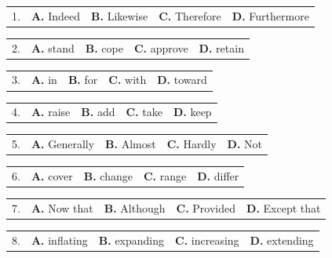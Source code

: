 \documentclass[UTF8,11pt]{ctexart}
\begin{document}
\noindent\begin{tabularx}{\linewidth}{@{}lXXXX@{}}1. & \textbf{A.} Indeed & \textbf{B.} Likewise & \textbf{C.} Therefore & \textbf{D.} Furthermore\\\end{tabularx}\par

\noindent\begin{tabularx}{\linewidth}{@{}lXXXX@{}}2. & \textbf{A.} stand & \textbf{B.} cope & \textbf{C.} approve & \textbf{D.} retain\\\end{tabularx}\par

\noindent\begin{tabularx}{\linewidth}{@{}lXXXX@{}}3. & \textbf{A.} in & \textbf{B.} for & \textbf{C.} with & \textbf{D.} toward\\\end{tabularx}\par

\noindent\begin{tabularx}{\linewidth}{@{}lXXXX@{}}4. & \textbf{A.} raise & \textbf{B.} add & \textbf{C.} take & \textbf{D.} keep\\\end{tabularx}\par

\noindent\begin{tabularx}{\linewidth}{@{}lXXXX@{}}5. & \textbf{A.} Generally & \textbf{B.} Almost & \textbf{C.} Hardly & \textbf{D.} Not\\\end{tabularx}\par

\noindent\begin{tabularx}{\linewidth}{@{}lXXXX@{}}6. & \textbf{A.} cover & \textbf{B.} change & \textbf{C.} range & \textbf{D.} differ\\\end{tabularx}\par

\noindent\begin{tabularx}{\linewidth}{@{}lXXXX@{}}7. & \textbf{A.} Now that & \textbf{B.} Although & \textbf{C.} Provided & \textbf{D.} Except that\\\end{tabularx}\par

\noindent\begin{tabularx}{\linewidth}{@{}lXXXX@{}}8. & \textbf{A.} inflating & \textbf{B.} expanding & \textbf{C.} increasing & \textbf{D.} extending\\\end{tabularx}\par
\end{document}
